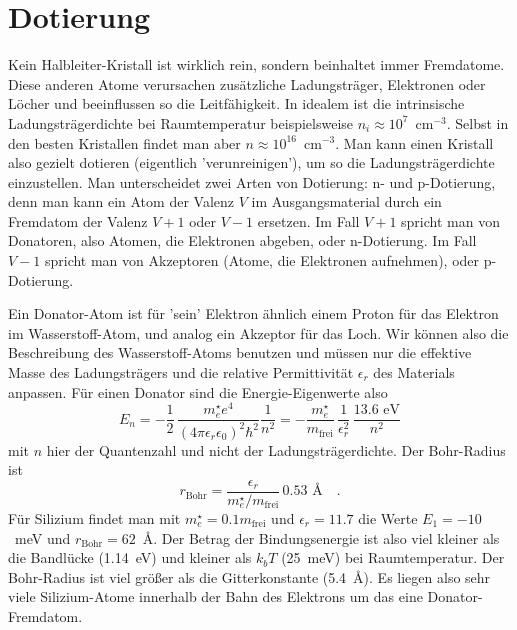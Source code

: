 \section{Dotierung}

Kein Halbleiter-Kristall ist wirklich rein, sondern beinhaltet immer Fremdatome. Diese anderen Atome verursachen zusätzliche Ladungsträger, Elektronen oder Löcher und beeinflussen so die Leitfähigkeit. In idealem  ist die intrinsische Ladungsträgerdichte bei Raumtemperatur beispielsweise $n_i \approx 10^7$~cm$^{-3}$. Selbst in den besten  Kristallen findet man aber $n \approx 10^{16}$~cm$^{-3}$. Man kann einen Kristall also gezielt dotieren (eigentlich 'verunreinigen'), um so die Ladungsträgerdichte einzustellen. Man unterscheidet zwei Arten von Dotierung: n- und p-Dotierung, denn man kann ein Atom der Valenz $V$ im Ausgangsmaterial durch ein Fremdatom der Valenz $V+1$ oder $V-1$ ersetzen. Im Fall $V+1$ spricht man von Donatoren, also Atomen, die Elektronen abgeben, oder n-Dotierung. Im Fall $V-1$ spricht man von Akzeptoren (Atome, die Elektronen aufnehmen), oder p-Dotierung.

Ein Donator-Atom ist für 'sein' Elektron ähnlich einem Proton für das Elektron im Wasserstoff-Atom, und analog ein Akzeptor für das Loch. Wir können also die Beschreibung des Wasserstoff-Atoms benutzen und müssen nur die effektive Masse des Ladungsträgers und die relative Permittivität $\epsilon_r$ des Materials anpassen. Für einen Donator sind die Energie-Eigenwerte also 
\begin{equation}
    E_n = - \frac{1}{2} \, \frac{m_e^\star e^4}{(4 \pi \epsilon_r \epsilon_0)^2 \hbar^2}
\frac{1}{n^2} =     
   - \frac{m_e^\star}{m_\text{frei}} \, \frac{1}{\epsilon_r^2} \, \frac{13.6 \text{ eV}}{n^2}
\end{equation}
mit $n$ hier der Quantenzahl und nicht der Ladungsträgerdichte. Der Bohr-Radius ist
\begin{equation}
    r_\text{Bohr} = \frac{\epsilon_r}{m_e^\star / m_\text{frei}} \, 0.53 \text{ \AA} \quad .
\end{equation}
Für Silizium findet man mit $m_e^\star = 0.1 m_\text{frei}$ und $\epsilon_r = 11.7$ die Werte $E_1 = -10$~meV und $ r_\text{Bohr} = 62$~\AA. Der Betrag der Bindungsenergie ist also viel kleiner als die Bandlücke (1.14~eV) und kleiner als $k_b T$ (25~meV) bei Raumtemperatur. Der Bohr-Radius ist viel größer als die Gitterkonstante (5.4~\AA). Es liegen also sehr viele Silizium-Atome innerhalb der Bahn des Elektrons um das eine Donator-Fremdatom.

